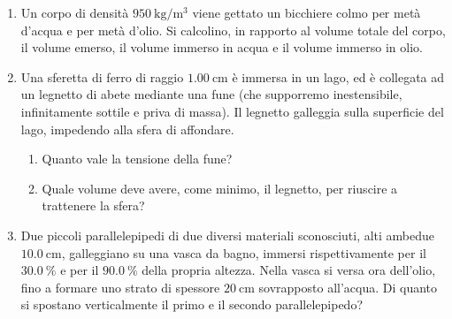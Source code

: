 \begin{enumerate}
    \item Un corpo di densità $\SI{950}{\kg/\meter^3}$ viene gettato un bicchiere colmo per metà d'acqua e per metà d'olio. Si calcolino, in rapporto al volume totale del corpo, il volume emerso, il volume immerso in acqua e il volume immerso in olio.
    
    \item Una sferetta di ferro di raggio $\SI{1,00}{\cm}$ è immersa in un lago, ed è collegata ad un legnetto di abete mediante una fune (che supporremo inestensibile, infinitamente sottile e priva di massa). Il legnetto galleggia sulla superficie del lago, impedendo alla sfera di affondare.
    \begin{enumerate}
        \item Quanto vale la tensione della fune?
        \item Quale volume deve avere, come minimo, il legnetto, per riuscire a trattenere la sfera?
    \end{enumerate}
    
    \item Due piccoli parallelepipedi di due diversi materiali sconosciuti, alti ambedue $\SI{10,0}{\cm}$, galleggiano su una vasca da bagno, immersi rispettivamente per il $\SI{30,0}{\percent}$ e per il $\SI{90,0}{\percent}$ della propria altezza. Nella vasca si versa ora dell'olio, fino a formare uno strato di spessore $\SI{20}{\cm}$ sovrapposto all'acqua. Di quanto si spostano verticalmente il primo e il secondo parallelepipedo?
\end{enumerate}